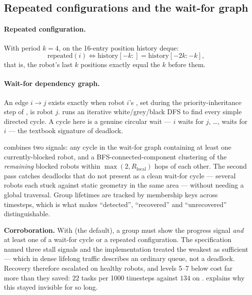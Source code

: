 \subsection{Repeated configurations and the wait-for graph}
\label{sec:deadlock-detection}

\paragraph{Repeated configuration.} With period $k = 4$, on the 16-entry
position history deque:
\begin{equation}
  \mathrm{repeated}(i) \iff
    \mathrm{history}[-k{:}] = \mathrm{history}[-2k : -k],
\end{equation}
that is, the robot's last $k$ positions exactly equal the $k$ before them.

\paragraph{Wait-for dependency graph.} An edge $i \rightarrow j$ exists exactly
when robot $i$'s , set during the
priority-inheritance step of , is robot $j$. 
runs an iterative white/grey/black DFS to find every simple directed cycle. A
cycle here is a genuine circular wait --- $i$ waits for $j$, \dots, waits for
$i$ --- the textbook signature of deadlock.

 combines two signals: any cycle in the
wait-for graph containing at least one currently-blocked robot, and a
BFS-connected-component clustering of the \emph{remaining} blocked robots
within $\max(2, R_{\mathrm{local}})$ hops of each other. The second pass
catches deadlocks that do not present as a clean wait-for cycle --- several
robots each stuck against static geometry in the same area --- without needing a
global traversal. Group lifetimes are tracked by  membership
keys across timesteps, which is what makes ``detected'', ``recovered'' and
``unrecovered'' distinguishable.

\begin{caveat}
\textbf{Corroboration.} With  (the
default), a group must show the progress signal \emph{and} at least one of a
wait-for cycle or a repeated configuration. The specification named three stall
signals and the implementation treated the weakest as sufficient --- which in
dense lifelong traffic describes an ordinary queue, not a deadlock. Recovery
therefore escalated on healthy robots, and levels 5--7 below cost far more than
they saved: $22$ tasks per 1000 timesteps against $134$ on
.  explains
why this stayed invisible for so long.
\end{caveat}

